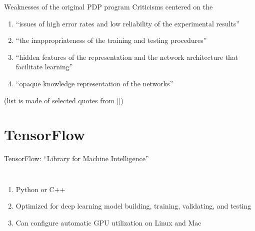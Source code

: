 \documentclass{beamer}
\begin{document}
\begin{frame}{Weaknesses of the original PDP program}
    Criticisms centered on the

    \begin{enumerate}
            \small
        \item ``issues of high error rates and low reliability of the experimental
            results''
        \item ``the inappropriateness of the training and testing
            procedures''
        \item ``hidden features of the representation and the network
            architecture that facilitate learning''
        \item ``opaque knowledge representation of the networks''
    \end{enumerate}

    (list is made of selected quotes from [])
\end{frame}


\section{TensorFlow}

\begin{frame}{TensorFlow: ``Library for Machine Intelligence''}
    \begin{columns}[c]
        \column{2.0in}

        \column{2.0in}
        \begin{enumerate}
            \item Python or C++
            \item Optimized for deep learning model building, training, validating, and testing
            \item Can configure automatic GPU utilization on Linux and Mac         \end{enumerate}
    \end{columns}
\end{frame}
\end{document}
